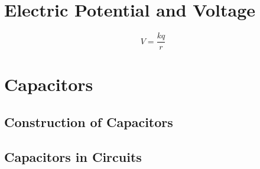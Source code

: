 	
	
	\section{Electric Potential and Voltage}
	
		\begin{mdframed}[backgroundcolor=orange!20!white]
	
	\begin{equation}
	V = \frac{kq}{r}
	\label{equation:electrostaticpotential}
	\end{equation}
\end{mdframed}	
	
	\section{Capacitors}
		\subsection{Construction of Capacitors}
		\subsection{Capacitors in Circuits}
		
	
	
	

	


